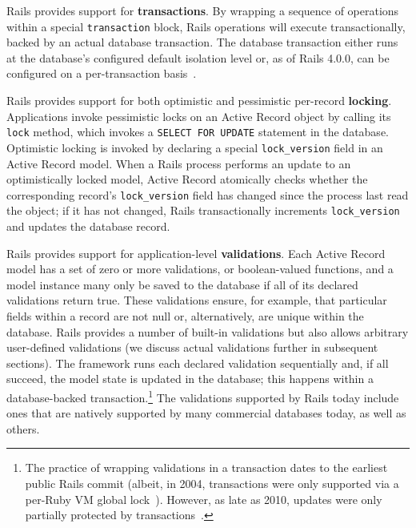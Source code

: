 \begin{myenumerate}
\item Rails provides support for \textbf{transactions}. By wrapping a
sequence of operations within a special \texttt{transaction} block,
Rails operations will execute transactionally, backed by an actual
database transaction. The database transaction either runs at the
database's configured default isolation level or, as of Rails 4.0.0, can
be configured on a per-transaction
basis~\cite{code-transaction-isolation}.

\item Rails provides support for both optimistic and pessimistic
  per-record \textbf{locking}. Applications invoke pessimistic locks
  on an Active Record object by calling its \texttt{lock} method,
  which invokes a \texttt{SELECT FOR UPDATE} statement in the
  database. Optimistic locking is invoked by declaring a special
  \texttt{lock\_version} field in an Active Record model. When a Rails
  process performs an update to an optimistically locked model, Active
  Record atomically checks whether the corresponding record's
  \texttt{lock\_version} field has changed since the process last read
  the object; if it has not changed, Rails transactionally increments
  \texttt{lock\_version} and updates the database record.

\item Rails provides support for application-level
  \textbf{validations}. Each Active Record model has a set of zero or more
  validations, or boolean-valued functions, and a model instance many
  only be saved to the database if all of its declared validations
  return true. These validations ensure, for example, that particular
  fields within a record are not null or, alternatively, are unique
  within the database. Rails provides a number of built-in validations
  but also allows arbitrary user-defined validations (we discuss
  actual validations further in subsequent sections). The framework
  runs each declared validation sequentially and, if all succeed, the
  model state is updated in the database; this happens within a
  database-backed transaction.\footnote{The practice of wrapping
    validations in a transaction dates to the earliest public Rails
    commit (albeit, in 2004, transactions were only supported via a
    per-Ruby VM global lock~\cite{code-txn-lock}). However, as late as
    2010, updates were only partially protected by
    transactions~\cite{code-txn-update}.} The validations supported by
  Rails today include ones that are natively supported by many
  commercial databases today, as well as others.\\[-2mm]


\end{myenumerate}
